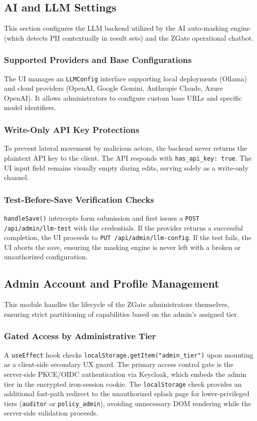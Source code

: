 \subsection{AI and LLM Settings}
This section configures the LLM backend utilized by the AI auto-masking engine (which detects PII contextually in result sets) and the ZGate operational chatbot.

\subsubsection{Supported Providers and Base Configurations}
The UI manages an \texttt{LLMConfig} interface supporting local deployments (Ollama) and cloud providers (OpenAI, Google Gemini, Anthropic Claude, Azure OpenAI). It allows administrators to configure custom base URLs and specific model identifiers.

\subsubsection{Write-Only API Key Protections}
To prevent lateral movement by malicious actors, the backend never returns the plaintext API key to the client. The API responds with \texttt{has\_api\_key: true}. The UI input field remains visually empty during edits, serving solely as a write-only channel. 

\subsubsection{Test-Before-Save Verification Checks}
\texttt{handleSave()} intercepts form submission and first issues a \texttt{POST /api/\allowbreak admin/\allowbreak llm-test} with the credentials. If the provider returns a successful completion, the UI proceeds to \texttt{PUT /api/\allowbreak admin/\allowbreak llm-config}. If the test fails, the UI aborts the save, ensuring the masking engine is never left with a broken or unauthorized configuration.

\subsection{Admin Account and Profile Management}
This module handles the lifecycle of the ZGate administrators themselves, ensuring strict partitioning of capabilities based on the admin's assigned tier.

\subsubsection{Gated Access by Administrative Tier}
A \texttt{useEffect} hook checks \texttt{localStorage.getItem("admin\_tier")} upon mounting as a client-side secondary UX guard. The primary access control gate is the server-side PKCE/OIDC authentication via Keycloak, which embeds the admin tier in the encrypted iron-session cookie. The \texttt{localStorage} check provides an additional fast-path redirect to the unauthorized splash page for lower-privileged tiers (\texttt{auditor} or \texttt{policy\_admin}), avoiding unnecessary DOM rendering while the server-side validation proceeds.

